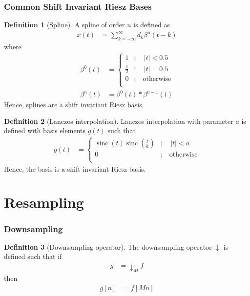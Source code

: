 \documentclass[titlepage, fleqn, a4paper, 12pt, twoside]{article}
\theoremstyle{definition}
\newtheorem{definition}{Definition}
\theoremstyle{theorem}
\DeclareMathOperator{\sinc}{\mathrm{sinc}}
\def\downsample#1{\downarrow_{#1}}
\begin{document}
\section{Common Shift Invariant Riesz Bases}

\begin{definition}[Spline]
	A spline of order $n$ is defined as
	\begin{align*}
		x(t) &= \sum\limits_{k = -\infty}^{\infty} d_k \beta^n(t - k)
	\end{align*}
	where
	\begin{align*}
		\beta^0(t) &=
			\begin{cases}
				1 &;\quad |t| < 0.5\\
				\frac{1}{2} &;\quad |t| = 0.5\\
				0 &;\quad \text{otherwise}\\
			\end{cases}\\
		\beta^n(t) &= \beta^0(t) \ast \beta^{n - 1}(t)
	\end{align*}
	Hence, splines are a shift invariant Riesz basis.
\end{definition}

\begin{definition}[Lanczos interpolation]
	Lanczos interpolation with parameter $a$ is defined with basis elements $g(t)$ such that
	\begin{align*}
		g(t) &=
			\begin{cases}
				\sinc(t) \sinc\left( \frac{t}{a} \right) &;\quad |t| < a\\
				0 &;\quad \text{otherwise}\\
			\end{cases}
	\end{align*}
	Hence, the basis is a shift invariant Riesz basis.
\end{definition}

\clearpage
\part{Resampling}

\section{Downsampling}

\begin{definition}[Downsampling operator]
	The downsampling operator $\downarrow$ is defined such that if
	\begin{align*}
		g &= \downsample{M} f
	\end{align*}
	then
	\begin{align*}
		g[n] &= f[M n]
	\end{align*}
\end{definition}
\end{document}
